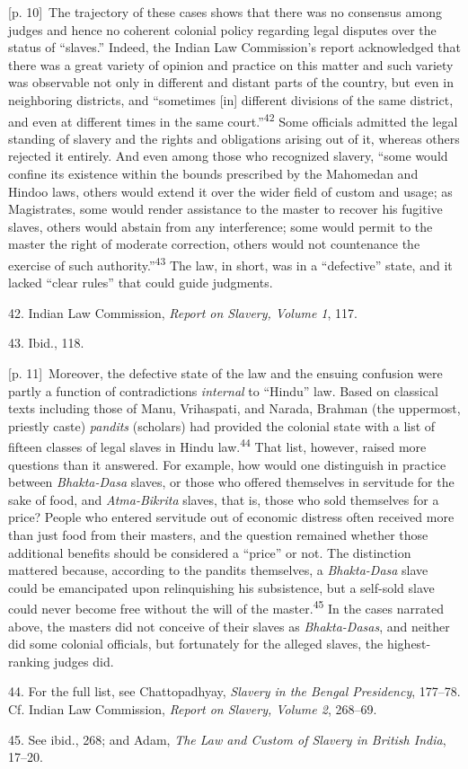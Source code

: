 \documentclass[10pt,a4paper]{article}
\begin{document}
{\scriptsize\color{gray} [p. 10]}\ The trajectory of these cases shows that there was no consensus among judges and hence no coherent colonial policy regarding legal disputes over the status of “slaves.” Indeed, the Indian Law Commission’s report acknowledged that there was a great variety of opinion and practice on this matter and such variety was observable not only in different and distant parts of the country, but even in neighboring districts, and “sometimes [in] different divisions of the same district, and even at different times in the same court.”\nobreak\textsuperscript{42} Some officials admitted the legal standing of slavery and the rights and obligations arising out of it, whereas others rejected it entirely. And even among those who recognized slavery, “some would confine its existence within the bounds prescribed by the Mahomedan and Hindoo laws, others would extend it over the wider field of custom and usage; as Magistrates, some would render assistance to the master to recover his fugitive slaves, others would abstain from any interference; some would permit to the master the right of moderate correction, others would not countenance the exercise of such authority.”\nobreak\textsuperscript{43} The law, in short, was in a “defective” state, and it lacked “clear rules” that could guide judgments.\par{\small 42. Indian Law Commission, \textit{Report on Slavery, Volume 1}, 117.\par}{\small 43. Ibid., 118.\par}
{\scriptsize\color{gray} [p. 11]}\ Moreover, the defective state of the law and the ensuing confusion were partly a function of contradictions \textit{internal} to “Hindu” law. Based on classical texts including those of Manu, Vrihaspati, and Narada, Brahman (the uppermost, priestly caste) \textit{pandits} (scholars) had provided the colonial state with a list of fifteen classes of legal slaves in Hindu law.\nobreak\textsuperscript{44} That list, however, raised more questions than it answered. For example, how would one distinguish in practice between \textit{Bhakta-Dasa} slaves, or those who offered themselves in servitude for the sake of food, and \textit{Atma-Bikrita} slaves, that is, those who sold themselves for a price? People who entered servitude out of economic distress often received more than just food from their masters, and the question remained whether those additional benefits should be considered a “price” or not. The distinction mattered because, according to the pandits themselves, a \textit{Bhakta-Dasa} slave could be emancipated upon relinquishing his subsistence, but a self-sold slave could never become free without the will of the master.\nobreak\textsuperscript{45} In the cases narrated above, the masters did not conceive of their slaves as \textit{Bhakta-Dasas}, and neither did some colonial officials, but fortunately for the alleged slaves, the highest-ranking judges did.\par{\small 44. For the full list, see Chattopadhyay, \textit{Slavery in the Bengal Presidency}, 177–78. Cf. Indian Law Commission, \textit{Report on Slavery, Volume 2}, 268–69.\par}{\small 45. See ibid., 268; and Adam, \textit{The Law and Custom of Slavery in British India}, 17–20.\par}
\end{document}
